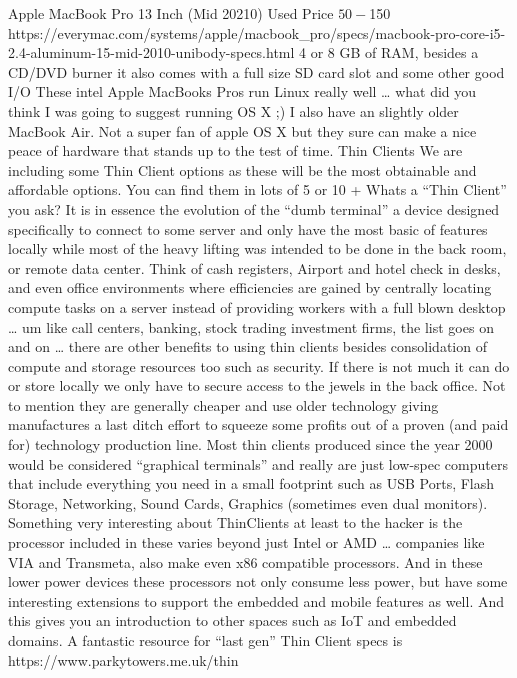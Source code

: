 Apple MacBook Pro 13 Inch (Mid 20210)
Used Price $50 - $150
https://everymac.com/systems/apple/macbook_pro/specs/macbook-pro-core-i5-2.4-aluminum-15-mid-2010-unibody-specs.html
4 or 8 GB of RAM, besides a CD/DVD burner it also comes with a full size SD card slot and some other good I/O
These intel Apple MacBooks Pros run Linux really well … what did you think I was going to suggest running OS X ;)
I also have an slightly older MacBook Air. Not a super fan of apple OS X but they sure can make a nice peace of hardware that stands up to the test of time.
Thin Clients
We are including some Thin Client options as these will be the most obtainable and affordable options. You can find them in lots of 5 or 10 +
Whats a “Thin Client” you ask? It is in essence the evolution of the “dumb terminal” a device designed specifically to connect to some server and only have the most basic of features locally while most of the heavy lifting was intended to be done in the back room, or remote data center. Think of cash registers, Airport and hotel check in desks, and even office environments where efficiencies are gained by centrally locating compute tasks on a server instead of providing workers with a full blown desktop … um like call centers, banking, stock trading investment firms, the list goes on and on … there are other benefits to using thin clients besides consolidation of compute and storage resources too such as security. If there is not much it can do or store locally we only have to secure access to the jewels in the back office. Not to mention they are generally cheaper and use older technology giving manufactures a last ditch effort to squeeze some profits out of a proven (and paid for) technology production line. 
Most thin clients produced since the year 2000 would be considered “graphical terminals” and really are just low-spec computers that include everything you need in a small footprint such as USB Ports, Flash Storage, Networking, Sound Cards, Graphics (sometimes even dual monitors). 
Something very interesting about ThinClients at least to the hacker is the processor included in these varies beyond just Intel or AMD … companies like VIA and Transmeta, also make even x86 compatible processors. And in these lower power devices these processors not only consume less power, but have some interesting extensions to support the embedded and mobile features as well. And this gives you an introduction to other spaces such as IoT and embedded domains. 
A fantastic resource for “last gen” Thin Client specs is 
https://www.parkytowers.me.uk/thin

